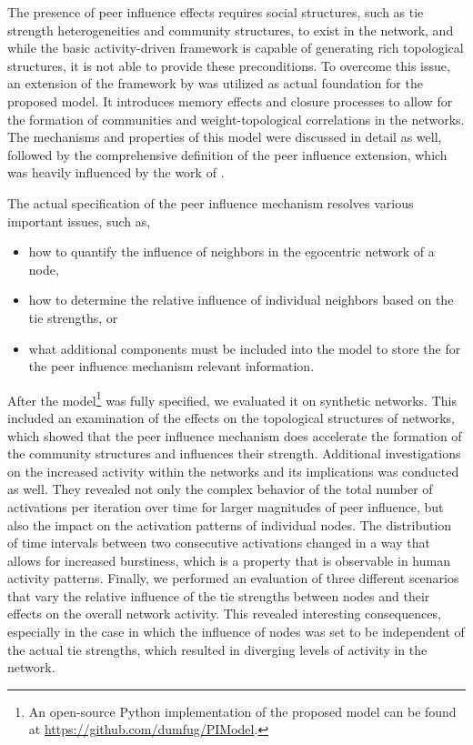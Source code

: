 The presence of peer influence effects requires social structures, such as tie strength heterogeneities and community structures, to exist in the network, and while the basic activity-driven framework is capable of generating rich topological structures, it is not able to provide these preconditions.
To overcome this issue, an extension of the framework by \citet{Laurent2015} was utilized as actual foundation for the proposed model.
It introduces memory effects and closure processes to allow for the formation of communities and weight-topological correlations in the networks.
The mechanisms and properties of this model were discussed in detail as well, followed by the comprehensive definition of the peer influence extension, which was heavily influenced by the work of \citet{Walk2016}.

The actual specification of the peer influence mechanism resolves various important issues, such as,

\begin{itemize}
    \item how to quantify the influence of neighbors in the egocentric network of a node,
    \item how to determine the relative influence of individual neighbors based on the tie strengths, or
    \item what additional components must be included into the model to store the for the peer influence mechanism relevant information.
\end{itemize}

After the model\footnote{An open-source Python implementation of the proposed model can be found at \url{https://github.com/dumfug/PIModel}.} was fully specified, we evaluated it on synthetic networks.
This included an examination of the effects on the topological structures of networks, which showed that the peer influence mechanism does accelerate the formation of the community structures and influences their strength.
Additional investigations on the increased activity within the networks and its implications was conducted as well.
They revealed not only the complex behavior of the total number of activations per iteration over time for larger magnitudes of peer influence, but also the impact on the activation patterns of individual nodes.
The distribution of time intervals between two consecutive activations changed in a way that allows for increased burstiness, which is a property that is observable in human activity patterns.
Finally, we performed an evaluation of three different scenarios that vary the relative influence of the tie strengths between nodes and their effects on the overall network activity.
This revealed interesting consequences, especially in the case in which the influence of nodes was set to be independent of the actual tie strengths, which resulted in diverging levels of activity in the network.


